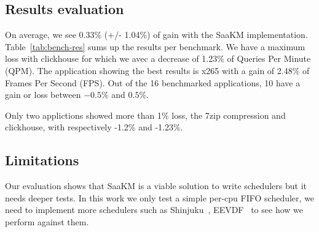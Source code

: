 
\subsection{Results evaluation}
\par On average, we see 0.33\% (+/- 1.04\%) of gain with the SaaKM implementation. Table~\ref{tab:bench-res} sums up the results per benchmark. We have a maximum loss with clickhouse for which we avec a decrease of 1.23\% of Queries Per Minute (QPM). The application showing the best results is x265 with a gain of 2.48\% of Frames Per Second (FPS). Out of the 16 benchmarked applications, 10 have a gain or loss between $-0.5\%$ and $0.5\%$. \newline

\par Only two applictions showed more than 1\% loss, the 7zip compression and clickhouse, with respectively -1.2\% and -1.23\%. \newline

\subsection{Limitations}
\par Our evaluation shows that SaaKM is a viable solution to write schedulers but it needs deeper tests. In this work we only test a simple per-cpu FIFO scheduler, we need to implement more schedulers such as Shinjuku~\cite{shinjuku}, EEVDF~\cite{eevdf} to see how we perform against them. \newline

